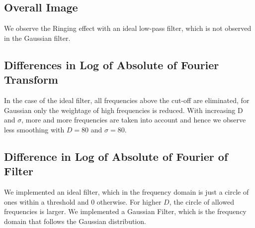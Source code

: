 \documentclass[a4paper]{article}
\begin{document}
\subsection{Overall Image}
We observe the Ringing effect with an ideal low-pass filter, which is not observed in the Gaussian filter.

\subsection{Differences in Log of Absolute of  Fourier Transform}
In the case of the ideal filter, all frequencies above the cut-off are eliminated, for Gaussian only the weightage of high frequencies is reduced. With increasing D and $\sigma$, more and more frequencies are taken into account and hence we observe less smoothing with $D = 80$ and $\sigma = 80$.

\subsection{Difference in Log of Absolute of Fourier of Filter}
We implemented an ideal filter, which in the frequency domain is just a circle of ones within a threshold and 0 otherwise. For higher $D$, the circle of allowed frequencies is larger.
We implemented a Gaussian Filter, which is the frequency domain that follows the Gaussian distribution.












    
\end{document}
